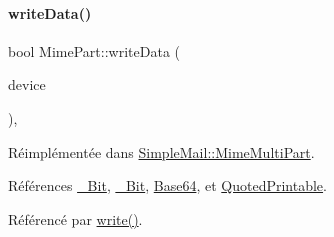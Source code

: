 \mbox{\label{class_simple_mail_1_1_mime_part_ab8b85a3cf47e6bd8d2051dfa5c56c36a}} 
\paragraph{\texorpdfstring{write\+Data()}{writeData()}}
{\footnotesize\ttfamily bool Mime\+Part\+::write\+Data (\begin{DoxyParamCaption}\item[{Q\+I\+O\+Device $\ast$}]{device }\end{DoxyParamCaption})\hspace{0.3cm}{\ttfamily [protected]}, {\ttfamily [virtual]}}



Réimplémentée dans \hyperlink{class_simple_mail_1_1_mime_multi_part_acbd14f495f45d946eaf779d680bd7ce1}{Simple\+Mail\+::\+Mime\+Multi\+Part}.



Références \hyperlink{class_simple_mail_1_1_mime_part_ae67a2f5406958b95b18bf31a7bbeb5c9a93d518d86036ce6f149ffa646b52235a}{\+\_\+Bit}, \hyperlink{class_simple_mail_1_1_mime_part_ae67a2f5406958b95b18bf31a7bbeb5c9a27c1574a6fe2fa936ae6cfe9654bb37f}{\+\_\+Bit}, \hyperlink{class_simple_mail_1_1_mime_part_ae67a2f5406958b95b18bf31a7bbeb5c9ae644dc14ba856889814d2da9c995b91a}{Base64}, et \hyperlink{class_simple_mail_1_1_mime_part_ae67a2f5406958b95b18bf31a7bbeb5c9a29b5533d69a04cfef2c3ff6538c44db0}{Quoted\+Printable}.



Référencé par \hyperlink{class_simple_mail_1_1_mime_part_a4de9e52dca51bdc87cf526970606910d}{write()}.



